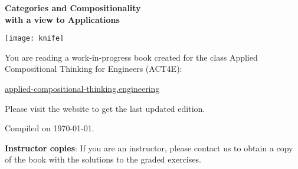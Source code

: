\thispagestyle{empty}
\begin{center}

    \vspace{3cm}
    {\Huge\bfseries Categories and Compositionality
        \\[3mm]with a view to Applications}%

\end{center}

\vfill
\begin{center}
    \texttt{[image: knife]}
\end{center}

\vfill
\clearpage
\vfill
You are reading a work-in-progress book created for the class Applied Compositional Thinking for Engineers (ACT4E):

\href{https://applied-compositional-thinking.engineering}{applied-compositional-thinking.engineering}

Please visit the website to get the last updated edition.

Compiled on \today.

\vspace{3cm}

\textbf{Instructor copies}: If you are an instructor, please contact us to obtain a copy of the book with the solutions to the graded exercises.

